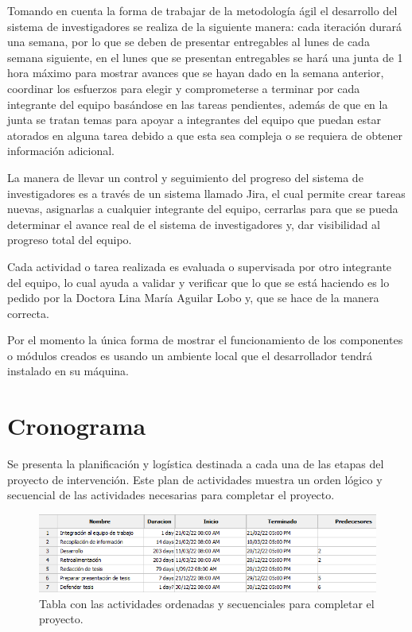     Tomando en cuenta la forma de trabajar de la metodología ágil el desarrollo del sistema de investigadores se realiza de la siguiente manera: cada iteración durará una semana, por lo que se deben de presentar entregables al lunes de cada semana siguiente, en el lunes que se presentan entregables se hará una junta de 1 hora máximo para mostrar avances que se hayan dado en la semana anterior, coordinar los esfuerzos para elegir y comprometerse a terminar por cada integrante del equipo basándose en las tareas pendientes, además de que en la junta se tratan temas para apoyar a integrantes del equipo que puedan estar atorados en alguna tarea debido a que esta sea compleja o se requiera de obtener información adicional.
    
    La manera de llevar un control y seguimiento del progreso del sistema de investigadores es a través de un sistema llamado Jira, el cual permite crear tareas nuevas, asignarlas a cualquier integrante del equipo, cerrarlas para que se pueda determinar el avance real de el sistema de investigadores y, dar visibilidad al progreso total del equipo.
    
    Cada actividad o tarea realizada es evaluada o supervisada por otro integrante del equipo, lo cual ayuda a validar y verificar que lo que se está haciendo es lo pedido por la Doctora Lina María Aguilar Lobo y, que se hace de la manera correcta.
    
    Por el momento la única forma de mostrar el funcionamiento de los componentes o módulos creados es usando un ambiente local que el desarrollador tendrá instalado en su máquina.

\section{Cronograma}

    Se presenta la planificación y logística destinada a cada una de las etapas del proyecto de intervención. Este plan de actividades muestra un orden lógico y secuencial de las actividades necesarias para completar el proyecto.
    
    \begin{figure}[H]
        \centering
        \includegraphics[width=\textwidth]{Propuesta_Plantilla_Tesis_LaTeX_UAG/imagenes/tasks_chronogram.png}
        \caption{Tabla con las actividades ordenadas y secuenciales para completar el proyecto.}
        \label{fig:tasksChronogram}
    \end{figure}


